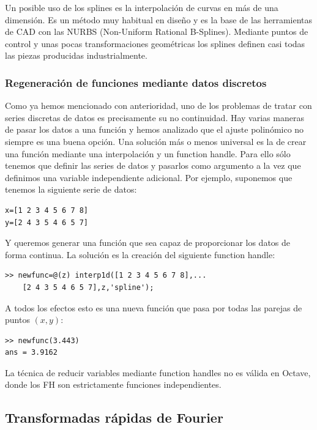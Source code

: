 Un posible uso de los splines es la interpolación de curvas en más de
una dimensión.  Es un método muy habitual en diseño y es la base de
las herramientas de CAD con las NURBS (Non-Uniform Rational B-Splines).
Mediante puntos de control y unas pocas transformaciones geométricas
los splines definen casi todas las piezas producidas industrialmente.

\subsubsection{Regeneración de funciones mediante datos discretos}

Como ya hemos mencionado con anterioridad, uno de los problemas de
tratar con series discretas de datos es precisamente su no
continuidad.  Hay varias maneras de pasar los datos a una función y
hemos analizado que el ajuste polinómico no siempre es una buena
opción. Una solución más o menos universal es la de crear una función
mediante una interpolación y un function handle. Para ello sólo
tenemos que definir las series de datos y pasarlos como argumento a la
vez que definimos una variable independiente adicional. Por ejemplo,
suponemos que tenemos la siguiente serie de datos:

\begin{verbatim}
x=[1 2 3 4 5 6 7 8]
y=[2 4 3 5 4 6 5 7]
\end{verbatim}
Y queremos generar una función que sea capaz de proporcionar los datos
de forma continua. La solución es la creación del siguiente function
handle:

\begin{verbatim}
>> newfunc=@(z) interp1d([1 2 3 4 5 6 7 8],...
    [2 4 3 5 4 6 5 7],z,'spline');
\end{verbatim}

A todos los efectos esto es una nueva función que pasa por todas las
parejas de puntos $(x,y)$:

\begin{verbatim}
>> newfunc(3.443)
ans = 3.9162
\end{verbatim}

La técnica de reducir variables mediante function handles no es válida
en Octave, donde los FH son estrictamente funciones independientes.


\subsection{Transformadas rápidas de Fourier}


